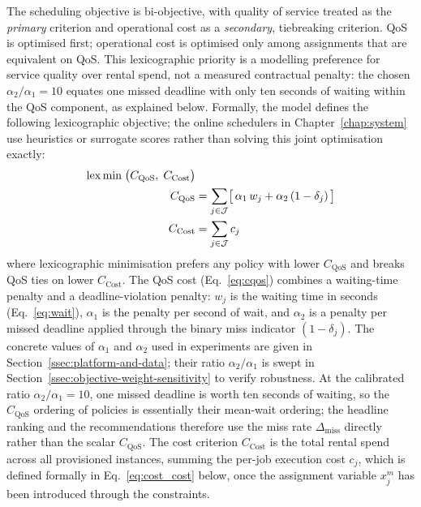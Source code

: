 The scheduling objective is bi-objective, with quality of service treated as the \emph{primary} criterion and operational cost as a \emph{secondary}, tiebreaking criterion. QoS is optimised first; operational cost is optimised only among assignments that are equivalent on QoS. This lexicographic priority is a modelling preference for service quality over rental spend, not a measured contractual penalty: the chosen $\alpha_2/\alpha_1=10$ equates one missed deadline with only ten seconds of waiting within the QoS component, as explained below. Formally, the model defines the following lexicographic objective; the online schedulers in Chapter~\ref{chap:system} use heuristics or surrogate scores rather than solving this joint optimisation exactly:
\begin{align}
\operatorname*{lex\,min}\; \bigl( C_{\text{QoS}},\; C_{\text{Cost}} \bigr) & \label{eq:objective}\\
C_{\text{QoS}} &= \sum_{j \in \mathcal{J}} \bigl[\, \alpha_1\, w_j + \alpha_2\, (1 - \delta_j) \,\bigr] \label{eq:cqos}\\
C_{\text{Cost}} &= \sum_{j \in \mathcal{J}} c_j \label{eq:ccost}
\end{align}
where lexicographic minimisation prefers any policy with lower $C_{\text{QoS}}$ and breaks QoS ties on lower $C_{\text{Cost}}$. The QoS cost (Eq.~\ref{eq:cqos}) combines a waiting-time penalty and a deadline-violation penalty: $w_j$ is the waiting time in seconds (Eq.~\ref{eq:wait}), $\alpha_1$ is the penalty per second of wait, and $\alpha_2$ is a penalty per missed deadline applied through the binary miss indicator $(1 - \delta_j)$. The concrete values of $\alpha_1$ and $\alpha_2$ used in experiments are given in Section~\ref{ssec:platform-and-data}; their ratio $\alpha_2/\alpha_1$ is swept in Section~\ref{ssec:objective-weight-sensitivity} to verify robustness. At the calibrated ratio $\alpha_2/\alpha_1 = 10$, one missed deadline is worth ten seconds of waiting, so the $C_{\text{QoS}}$ ordering of policies is essentially their mean-wait ordering; the headline ranking and the recommendations therefore use the miss rate $\Delta_{\text{miss}}$ directly rather than the scalar $C_{\text{QoS}}$. The cost criterion $C_{\text{Cost}}$ is the total rental spend across all provisioned instances, summing the per-job execution cost $c_j$, which is defined formally in Eq.~\ref{eq:cost_cost} below, once the assignment variable $x_j^m$ has been introduced through the constraints.

